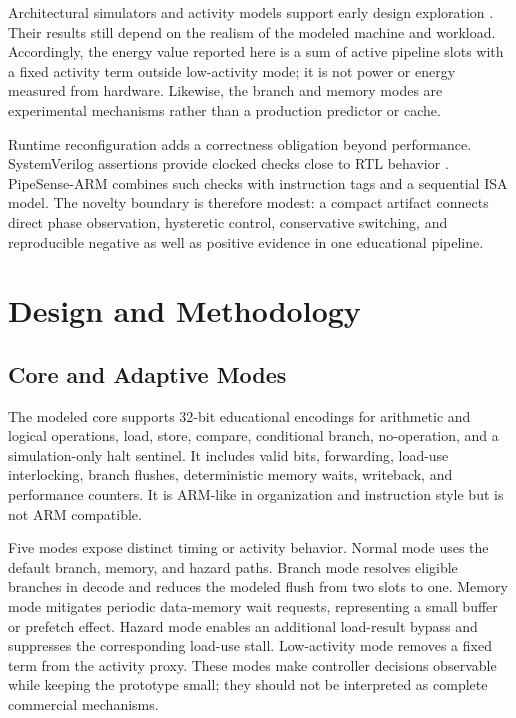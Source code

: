 \documentclass[conference]{IEEEtran}
\newcommand{\pipesense}{PipeSense-ARM}
\begin{document}
Architectural simulators and activity models support early design exploration
\cite{austin2002simplescalar,brooks2000wattch}. Their results still depend on
the realism of the modeled machine and workload. Accordingly, the energy value
reported here is a sum of active pipeline slots with a fixed activity term
outside low-activity mode; it is not power or energy measured from hardware.
Likewise, the branch and memory modes are experimental mechanisms rather than
a production predictor or cache.

Runtime reconfiguration adds a correctness obligation beyond performance.
SystemVerilog assertions provide clocked checks close to RTL behavior
\cite{ieee1800_2023,foster2004assertion}. \pipesense{} combines such checks
with instruction tags and a sequential ISA model. The novelty boundary is
therefore modest: a compact artifact connects direct phase observation,
hysteretic control, conservative switching, and reproducible negative as well
as positive evidence in one educational pipeline.

\section{Design and Methodology}

\subsection{Core and Adaptive Modes}

The modeled core supports 32-bit educational encodings for arithmetic and
logical operations, load, store, compare, conditional branch, no-operation,
and a simulation-only halt sentinel. It includes valid bits, forwarding,
load-use interlocking, branch flushes, deterministic memory waits, writeback,
and performance counters. It is ARM-like in organization and instruction style
but is not ARM compatible.

Five modes expose distinct timing or activity behavior. Normal mode uses the
default branch, memory, and hazard paths. Branch mode resolves eligible
branches in decode and reduces the modeled flush from two slots to one. Memory
mode mitigates periodic data-memory wait requests, representing a small buffer
or prefetch effect. Hazard mode enables an additional load-result bypass and
suppresses the corresponding load-use stall. Low-activity mode removes a fixed
term from the activity proxy. These modes make controller decisions observable
while keeping the prototype small; they should not be interpreted as complete
commercial mechanisms.
\end{document}
